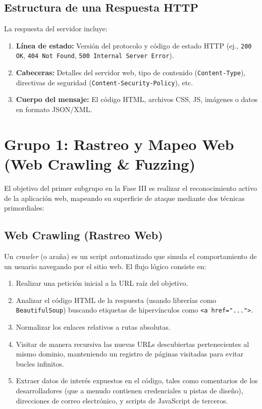 \documentclass[12pt,letterpaper]{article}
\begin{document}
\subsection{Estructura de una Respuesta HTTP}
La respuesta del servidor incluye:
\begin{enumerate}
    \item \textbf{Línea de estado:} Versión del protocolo y código de estado HTTP (ej., \texttt{200 OK}, \texttt{404 Not Found}, \texttt{500 Internal Server Error}).
    \item \textbf{Cabeceras:} Detalles del servidor web, tipo de contenido (\texttt{Content-Type}), directivas de seguridad (\texttt{Content-Security-Policy}), etc.
    \item \textbf{Cuerpo del mensaje:} El código HTML, archivos CSS, JS, imágenes o datos en formato JSON/XML.
\end{enumerate}

\section{Grupo 1: Rastreo y Mapeo Web (Web Crawling \& Fuzzing)}
El objetivo del primer subgrupo en la Fase III es realizar el reconocimiento activo de la aplicación web, mapeando su superficie de ataque mediante dos técnicas primordiales:

\subsection{Web Crawling (Rastreo Web)}
Un \textit{crawler} (o araña) es un script automatizado que simula el comportamiento de un usuario navegando por el sitio web. El flujo lógico consiste en:
\begin{enumerate}
    \item Realizar una petición inicial a la URL raíz del objetivo.
    \item Analizar el código HTML de la respuesta (usando librerías como \texttt{BeautifulSoup}) buscando etiquetas de hipervínculos como \texttt{<a href="...">}.
    \item Normalizar los enlaces relativos a rutas absolutas.
    \item Visitar de manera recursiva las nuevas URLs descubiertas pertenecientes al mismo dominio, manteniendo un registro de páginas visitadas para evitar bucles infinitos.
    \item Extraer datos de interés expuestos en el código, tales como comentarios de los desarrolladores (que a menudo contienen credenciales u pistas de diseño), direcciones de correo electrónico, y scripts de JavaScript de terceros.
\end{enumerate}
\end{document}
